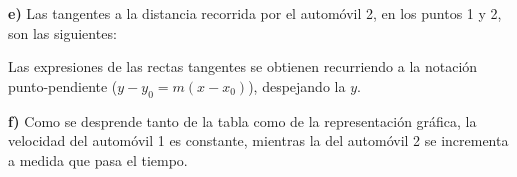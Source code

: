 \textbf{e)} Las tangentes a la distancia recorrida por el automóvil 2, en los puntos 1 y 2, son las siguientes:

\begin{center}
\end{center}

Las expresiones de las rectas tangentes se obtienen recurriendo a la notación punto-pendiente ($y-y_0 = m(x-x_0)$), despejando la $y$.

\vspace{10pt}

\textbf{f)} Como se desprende tanto de la tabla como de la representación gráfica, la velocidad del automóvil 1 es constante, mientras la del automóvil 2 se incrementa a medida que pasa el tiempo.
